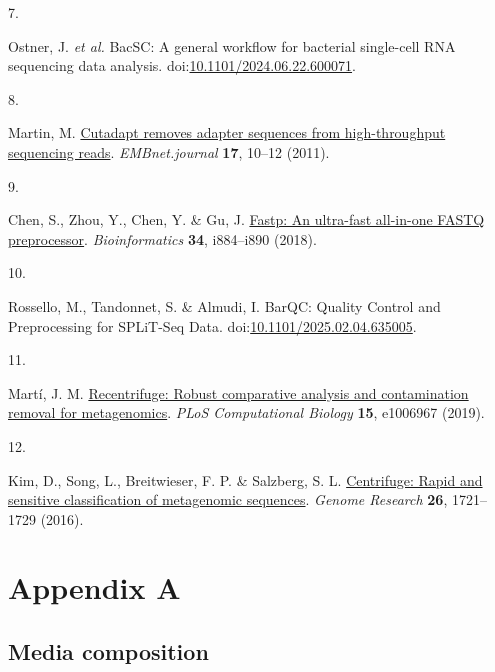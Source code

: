 \documentclass[
  11pt,
  a4paper,
]{report}
\newlength{\cslhangindent}
\newlength{\csllabelwidth}
\newenvironment{CSLReferences}[2] %
 {\begin{list}{}{%
  \setlength{\itemindent}{0pt}
  \setlength{\leftmargin}{0pt}
  \setlength{\parsep}{0pt}
  \ifodd #1
   \setlength{\leftmargin}{\cslhangindent}
   \setlength{\itemindent}{-1\cslhangindent}
  \fi
  \setlength{\itemsep}{#2\baselineskip}}}
 {\end{list}}
\newcommand{\CSLLeftMargin}[1]{\parbox[t]{\csllabelwidth}{\strut#1\strut}}
\newcommand{\CSLRightInline}[1]{\parbox[t]{\linewidth - \csllabelwidth}{\strut#1\strut}}
\begin{document}
\begin{CSLReferences}{0}{0}
\CSLLeftMargin{7. }%
\CSLRightInline{Ostner, J. \emph{et al.} BacSC: A general workflow for
bacterial single-cell RNA sequencing data analysis.
doi:\href{https://doi.org/10.1101/2024.06.22.600071}{10.1101/2024.06.22.600071}.}

\CSLLeftMargin{8. }%
\CSLRightInline{Martin, M.
\href{https://doi.org/10.14806/ej.17.1.200}{Cutadapt removes adapter
sequences from high-throughput sequencing reads}. \emph{EMBnet.journal}
\textbf{17}, 10--12 (2011).}

\CSLLeftMargin{9. }%
\CSLRightInline{Chen, S., Zhou, Y., Chen, Y. \& Gu, J.
\href{https://doi.org/10.1093/bioinformatics/bty560}{Fastp: An
ultra-fast all-in-one FASTQ preprocessor}. \emph{Bioinformatics}
\textbf{34}, i884--i890 (2018).}

\CSLLeftMargin{10. }%
\CSLRightInline{Rossello, M., Tandonnet, S. \& Almudi, I. BarQC: Quality
Control and Preprocessing for SPLiT-Seq Data.
doi:\href{https://doi.org/10.1101/2025.02.04.635005}{10.1101/2025.02.04.635005}.}

\CSLLeftMargin{11. }%
\CSLRightInline{Martí, J. M.
\href{https://doi.org/10.1371/journal.pcbi.1006967}{Recentrifuge: Robust
comparative analysis and contamination removal for metagenomics}.
\emph{PLoS Computational Biology} \textbf{15}, e1006967 (2019).}

\CSLLeftMargin{12. }%
\CSLRightInline{Kim, D., Song, L., Breitwieser, F. P. \& Salzberg, S. L.
\href{https://doi.org/10.1101/gr.210641.116}{Centrifuge: Rapid and
sensitive classification of metagenomic sequences}. \emph{Genome
Research} \textbf{26}, 1721--1729 (2016).}

\end{CSLReferences}

\cleardoublepage
{}
{}
\appendix

\chapter{Appendix A}\label{sec-appendix-a}

\section{Media composition}\label{sec-appendix-media}
\end{document}
